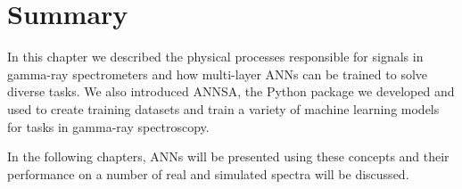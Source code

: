\section{Summary}

In this chapter we described the physical processes responsible for signals in gamma-ray spectrometers and how multi-layer ANNs can be trained to solve diverse tasks. We also introduced ANNSA, the Python package we developed and used to create training datasets and train a variety of machine learning models for tasks in gamma-ray spectroscopy. 

In the following chapters, ANNs will be presented using these concepts and their performance on a number of real and simulated spectra will be discussed. 
